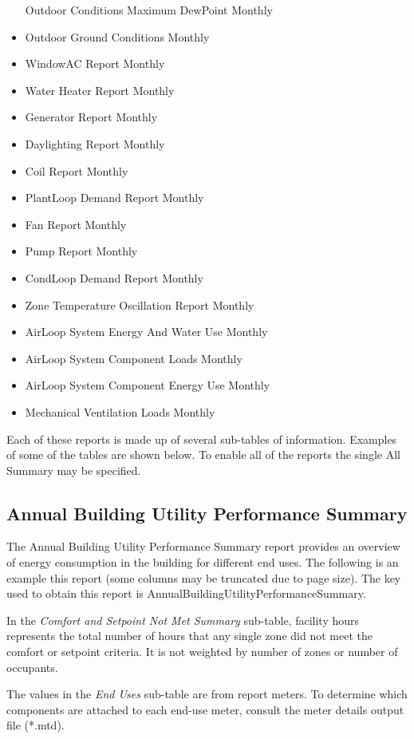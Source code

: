 \begin{itemize}
  Outdoor Conditions Maximum DewPoint Monthly
\item
  Outdoor Ground Conditions Monthly
\item
  WindowAC Report Monthly
\item
  Water Heater Report Monthly
\item
  Generator Report Monthly
\item
  Daylighting Report Monthly
\item
  Coil Report Monthly
\item
  PlantLoop Demand Report Monthly
\item
  Fan Report Monthly
\item
  Pump Report Monthly
\item
  CondLoop Demand Report Monthly
\item
  Zone Temperature Oscillation Report Monthly
\item
  AirLoop System Energy And Water Use Monthly
\item
  AirLoop System Component Loads Monthly
\item
  AirLoop System Component Energy Use Monthly
\item
  Mechanical Ventilation Loads Monthly
\end{itemize}

Each of these reports is made up of several sub-tables of information. Examples of some of the tables are shown below. To enable all of the reports the single All Summary may be specified.

\subsection{Annual Building Utility Performance Summary}\label{annual-building-utility-performance-summary}

The Annual Building Utility Performance Summary report provides an overview of energy consumption in the building for different end uses. The following is an example this report (some columns may be truncated due to page size). The key used to obtain this report is AnnualBuildingUtilityPerformanceSummary.

In the \emph{Comfort and Setpoint Not Met Summary} sub-table, facility hours represents the total number of hours that any single zone did not meet the comfort or setpoint criteria. It is not weighted by number of zones or number of occupants.

The values in the \emph{End Uses} sub-table are from report meters. To determine which components are attached to each end-use meter, consult the meter details output file (*.mtd).

